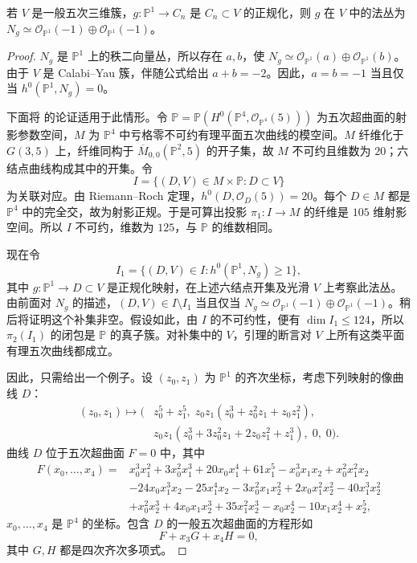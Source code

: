 \begin{lemma}\label{lem:nodal-quintic-normal-bundle}
若 $V$ 是一般五次三维簇，$g:\mathbb P^1\to C_n$ 是 $C_n\subset V$ 的正规化，则 $g$ 在 $V$ 中的法丛为 $N_g\simeq\mathcal O_{\mathbb P^1}(-1)\oplus\mathcal O_{\mathbb P^1}(-1)$。
\end{lemma}
\begin{proof}
$N_g$ 是 $\mathbb P^1$ 上的秩二向量丛，所以存在 $a,b$，使 $N_g\simeq\mathcal O_{\mathbb P^1}(a)\oplus\mathcal O_{\mathbb P^1}(b)$。由于 $V$ 是 Calabi--Yau 簇，伴随公式给出 $a+b=-2$。因此，$a=b=-1$ 当且仅当 $h^0(\mathbb P^1,N_g)=0$。

下面将  的论证适用于此情形。令 $\mathbb P=\mathbb P(H^0(\mathbb P^4,\mathcal O_{\mathbb P^4}(5)))$ 为五次超曲面的射影参数空间，$M$ 为 $\mathbb P^4$ 中亏格零不可约有理平面五次曲线的模空间。$M$ 纤维化于 $G(3,5)$ 上，纤维同构于 $\overline M_{0,0}(\mathbb P^2,5)$ 的开子集，故 $M$ 不可约且维数为 $20$；六结点曲线构成其中的开集。令
\[
I=\{(D,V)\in M\times\mathbb P:D\subset V\}
\]
为关联对应。由 Riemann--Roch 定理，$h^0(D,\mathcal O_D(5))=20$。每个 $D\in M$ 都是 $\mathbb P^4$ 中的完全交，故为射影正规。于是可算出投影 $\pi_1:I\to M$ 的纤维是 $105$ 维射影空间。所以 $I$ 不可约，维数为 $125$，与 $\mathbb P$ 的维数相同。

现在令
\[
I_1=\{(D,V)\in I:h^0(\mathbb P^1,N_g)\ge1\},
\]
其中 $g:\mathbb P^1\to D\subset V$ 是正规化映射，在上述六结点开集及光滑 $V$ 上考察此法丛。由前面对 $N_g$ 的描述，$(D,V)\in I\setminus I_1$ 当且仅当 $N_g\simeq\mathcal O_{\mathbb P^1}(-1)\oplus\mathcal O_{\mathbb P^1}(-1)$。稍后将证明这个补集非空。假设如此，由 $I$ 的不可约性，便有 $\dim I_1\le124$，所以 $\pi_2(I_1)$ 的闭包是 $\mathbb P$ 的真子簇。对补集中的 $V$，引理的断言对 $V$ 上所有这类平面有理五次曲线都成立。

因此，只需给出一个例子。设 $(z_0,z_1)$ 为 $\mathbb P^1$ 的齐次坐标，考虑下列映射的像曲线 $D$：
\begin{equation}\label{eq:nodal-quintic-parametrization}
\begin{aligned}
(z_0,z_1)\longmapsto\bigl(&z_0^5+z_1^5,\;
 z_0z_1(z_0^3+z_0^2z_1+z_0z_1^2),\\
 &z_0z_1(z_0^3+3z_0^2z_1+2z_0z_1^2+z_1^3),\;0,\;0\bigr).
\end{aligned}
\end{equation}
曲线 $D$ 位于五次超曲面 $F=0$ 中，其中
\begin{equation}\label{eq:nodal-quintic-equation}
\begin{aligned}
F(x_0,\ldots,x_4)={}&x_0^3x_1^2+3x_0^2x_1^3+20x_0x_1^4+61x_1^5
 -x_0^3x_1x_2+x_0^2x_1^2x_2\\
&-24x_0x_1^3x_2-25x_1^4x_2-3x_0^2x_1x_2^2
 +2x_0x_1^2x_2^2-40x_1^3x_2^2\\
&+x_0^2x_2^3+4x_0x_1x_2^3+35x_1^2x_2^3
 -x_0x_2^4-10x_1x_2^4+x_2^5,
\end{aligned}
\end{equation}
$x_0,\ldots,x_4$ 是 $\mathbb P^4$ 的坐标。包含 $D$ 的一般五次超曲面的方程形如
\begin{equation}\label{eq:quintic-containing-nodal-curve}
F+x_3G+x_4H=0,
\end{equation}
其中 $G,H$ 都是四次齐次多项式。


\end{proof}
